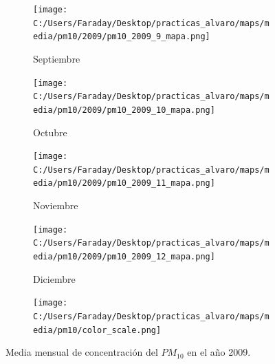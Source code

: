 \documentclass[12pt]{beamer}
\begin{document}
\begin{frame}[squeeze]
\begin{figure}[H]
\begin{subfigure}[H]{0.20\textwidth}
\texttt{[image: C:/Users/Faraday/Desktop/practicas\_alvaro/maps/media/pm10/2009/pm10\_2009\_9\_mapa.png]}
\captionsetup{labelformat=empty}
\caption{\scriptsize Septiembre}
\label{fig:map-pm10-2009-9}
\end{subfigure}
%
\begin{subfigure}[H]{0.20\textwidth}
\texttt{[image: C:/Users/Faraday/Desktop/practicas\_alvaro/maps/media/pm10/2009/pm10\_2009\_10\_mapa.png]}
\captionsetup{labelformat=empty}
\caption{\scriptsize Octubre}
\label{fig:map-pm10-2009-10}
\end{subfigure}
%
\begin{subfigure}[H]{0.20\textwidth}
\texttt{[image: C:/Users/Faraday/Desktop/practicas\_alvaro/maps/media/pm10/2009/pm10\_2009\_11\_mapa.png]}
\captionsetup{labelformat=empty}
\caption{\scriptsize Noviembre}
\label{fig:map-pm10-2009-11}
\end{subfigure}
%
\begin{subfigure}[H]{0.20\textwidth}
\texttt{[image: C:/Users/Faraday/Desktop/practicas\_alvaro/maps/media/pm10/2009/pm10\_2009\_12\_mapa.png]}
\captionsetup{labelformat=empty}
\caption{\scriptsize Diciembre}
\label{fig:map-pm10-2009-12}
\end{subfigure}

\begin{subfigure}[H]{0.45\textwidth}
\texttt{[image: C:/Users/Faraday/Desktop/practicas\_alvaro/maps/media/pm10/color\_scale.png]}
\captionsetup{labelformat=empty}
\caption{}
\end{subfigure}

\vspace*{-7mm}
\caption{\scriptsize Media mensual de concentración del $PM_{10}$ en el año 2009.}
\label{fig:map-pm10-2009}
\end{figure}
\end{frame}
\end{document}
